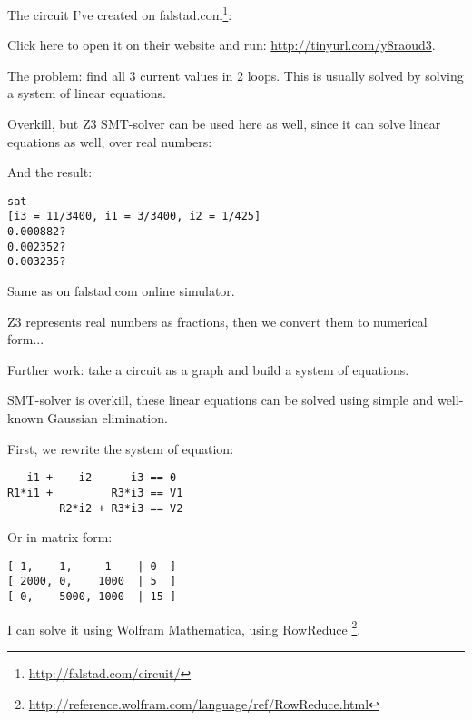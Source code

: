 
\renewcommand{\CURPATH}{linear/gauss}

\leveldown{}

The circuit I've created on
falstad.com\footnote{\url{http://falstad.com/circuit/}}:

\begin{figure}[H]
\centering
{}
\end{figure}

Click here to open it on their website and run: \url{http://tinyurl.com/y8raoud3}.

The problem: find all 3 current values in 2 loops.
This is usually solved by solving a system of linear equations.

Overkill, but Z3 SMT-solver can be used here as well, since it can solve linear equations as well, over real numbers:



And the result:

\begin{lstlisting}
sat
[i3 = 11/3400, i1 = 3/3400, i2 = 1/425]
0.000882?
0.002352?
0.003235?
\end{lstlisting}

Same as on falstad.com online simulator.

Z3 represents real numbers as fractions, then we convert them to numerical form...

Further work: take a circuit as a graph and build a system of equations.


SMT-solver is overkill, these linear equations can be solved using simple and well-known Gaussian elimination.

First, we rewrite the system of equation:

\begin{lstlisting}
   i1 +    i2 -    i3 == 0
R1*i1 +         R3*i3 == V1
        R2*i2 + R3*i3 == V2
\end{lstlisting}

Or in matrix form:

\begin{lstlisting}
[ 1,    1,    -1    | 0  ]
[ 2000, 0,    1000  | 5  ]
[ 0,    5000, 1000  | 15 ]
\end{lstlisting}

I can solve it using Wolfram Mathematica, using RowReduce
\footnote{\url{http://reference.wolfram.com/language/ref/RowReduce.html}}.

